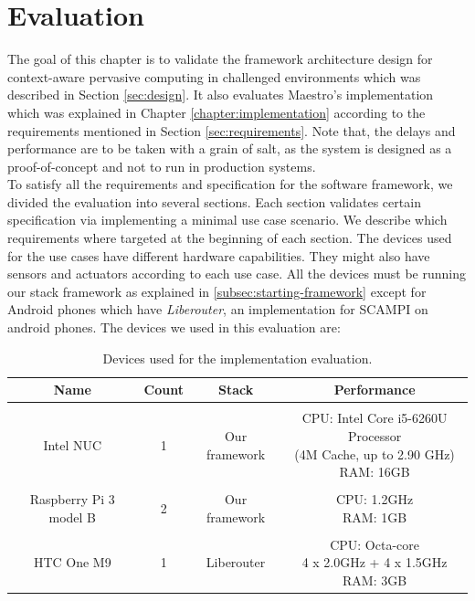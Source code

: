 
\chapter{Evaluation}\label{chapter:Evaluation}

The goal of this chapter is to validate the framework architecture design for context-aware pervasive computing in challenged environments which was described in Section \ref{sec:design}. It also evaluates Maestro's implementation which was explained in Chapter \ref{chapter:implementation} according to the requirements mentioned in Section \ref{sec:requirements}. Note that, the delays and performance are to be taken with a grain of salt, as the system is designed as a proof-of-concept and not to run in production systems. \\

\noindent To satisfy all the requirements and specification for the software framework, we divided the evaluation into several sections. Each section validates certain specification via implementing a minimal use case scenario. We describe which requirements where targeted at the beginning of each section. The devices used for  the use cases have different hardware capabilities. They might also have  sensors and actuators according to each use case. All the devices must be running our stack framework as explained in \ref{subsec:starting-framework} except for Android phones which have \textit{Liberouter}, an implementation for SCAMPI on android phones. The devices we used in this evaluation are:
\begin{table}[!ht]
	\centering
	\begin{tabular}{*{4}{c}}\toprule
		Name & Count & Stack & Performance \\ \hline
		 &  &  &  \\
		Intel NUC &1& 	Our framework &   \specialcell[c]{CPU: Intel Core i5-6260U Processor\\ (4M Cache, up to 2.90 GHz)\\RAM: 16GB }\\ 
		&  &  &  \\
		Raspberry Pi 3 model B & 2 & Our framework &  \specialcell[c]{ CPU: 1.2GHz\\RAM: 1GB}  \\ 
		&  &  &  \\
		HTC One M9 & 1 & Liberouter &   \specialcell[c]{CPU: Octa-core \\4 x 2.0GHz + 4 x 1.5GHz\\ RAM: 3GB} \\ \hline

\end{tabular}
\caption{Devices used for the implementation evaluation.}
\label{table:devoces}
\end{table}

